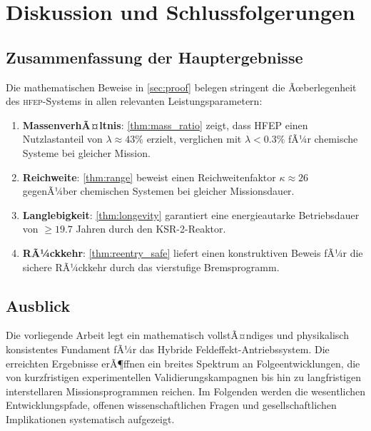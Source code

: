 ﻿\documentclass[a4paper,12pt,twoside]{article}
\theoremstyle{plain}
\theoremstyle{definition}
\theoremstyle{remark}
\newcommand{\HFEP}{\textsc{hfep}}
\begin{document}
	\section{Diskussion und Schlussfolgerungen}
	\label{sec:discussion}
	
	\subsection{Zusammenfassung der Hauptergebnisse}
	
	Die mathematischen Beweise in \cref{sec:proof} belegen stringent die Ãœberlegenheit
	des \HFEP-Systems in allen relevanten Leistungsparametern:
	
	\begin{enumerate}
		\item \textbf{MassenverhÃ¤ltnis}: \cref{thm:mass_ratio} zeigt, dass HFEP einen
		Nutzlastanteil von $\lambda \approx 43\%$ erzielt, verglichen mit
		$\lambda < 0.3\%$ fÃ¼r chemische Systeme bei gleicher Mission.
		
		\item \textbf{Reichweite}: \cref{thm:range} beweist einen Reichweitenfaktor
		$\kappa \approx 26$ gegenÃ¼ber chemischen Systemen bei gleicher Missionsdauer.
		
		\item \textbf{Langlebigkeit}: \cref{thm:longevity} garantiert eine
		energieautarke Betriebsdauer von $\geq 19.7$ Jahren durch den KSR-2-Reaktor.
		
		\item \textbf{RÃ¼ckkehr}: \cref{thm:reentry_safe} liefert einen konstruktiven
		Beweis fÃ¼r die sichere RÃ¼ckkehr durch das vierstufige Bremsprogramm.
	\end{enumerate}
	
	\subsection{Ausblick}
	\label{sec:ausblick}

	Die vorliegende Arbeit legt ein mathematisch vollstÃ¤ndiges und physikalisch
	konsistentes Fundament fÃ¼r das Hybride Feldeffekt-Antriebssystem. Die erreichten
	Ergebnisse erÃ¶ffnen ein breites Spektrum an Folgeentwicklungen, die von
	kurzfristigen experimentellen Validierungskampagnen bis hin zu langfristigen
	interstellaren Missionsprogrammen reichen. Im Folgenden werden die wesentlichen
	Entwicklungspfade, offenen wissenschaftlichen Fragen und gesellschaftlichen
	Implikationen systematisch aufgezeigt.
\end{document}
